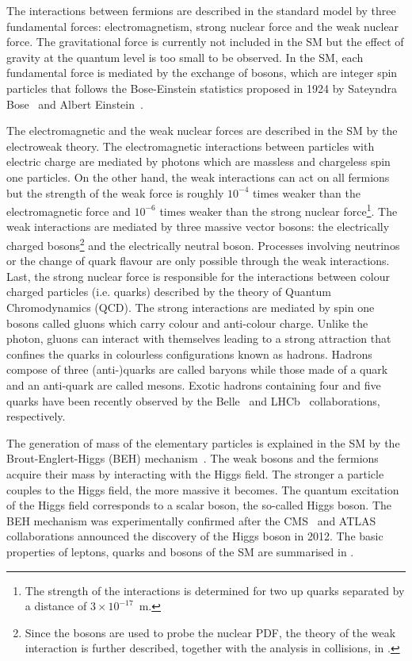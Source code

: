 The interactions between fermions are described in the standard model by three fundamental forces: electromagnetism, strong nuclear force and the weak nuclear force. The gravitational force is currently not included in the SM but the effect of gravity at the quantum level is too small to be observed. In the SM, each fundamental force is mediated by the exchange of bosons, which are integer spin particles that follows the Bose-Einstein statistics proposed in 1924 by Sateyndra Bose~\cite{BoseEinsteinStatistics_1} and Albert Einstein~\cite{BoseEinsteinStatistics_2}.

The electromagnetic and the weak nuclear forces are described in the SM by the electroweak theory. The electromagnetic interactions between particles with electric charge are mediated by photons which are massless and chargeless spin one particles. On the other hand, the weak interactions can act on all fermions but the strength of the weak force is roughly $10^{-4}$ times weaker than the electromagnetic force and $10^{-6}$ times weaker than the strong nuclear force\footnote{The strength of the interactions is determined for two up quarks separated by a distance of $3\times{10^{-17}}$~m.}. The weak interactions are mediated by three massive vector bosons: the electrically charged \Wpm bosons\footnote{Since the \Wb bosons are used to probe the nuclear PDF, the theory of the weak interaction is further described, together with the analysis in \RunpPb collisions, in .} and the electrically neutral {\PZ} boson. Processes involving neutrinos or the change of quark flavour are only possible through the weak interactions. Last, the strong nuclear force is responsible for the interactions between colour charged particles (i.e. quarks) described by the theory of Quantum Chromodynamics (QCD). The strong interactions are mediated by spin one bosons called gluons which carry colour and anti-colour charge. Unlike the photon, gluons can interact with themselves leading to a strong attraction that confines the quarks in colourless configurations known as hadrons. Hadrons compose of three (anti-)quarks are called baryons while those made of a quark and an anti-quark are called mesons. Exotic hadrons containing four and five quarks have been recently observed by the Belle~\cite{Tetraquark} and LHCb~\cite{Pentaquarks} collaborations, respectively.

The generation of mass of the elementary particles is explained in the SM by the Brout-Englert-Higgs (BEH) mechanism~\cite{HiggsMechanism_1,HiggsMechanism_2}. The weak bosons and the fermions acquire their mass by interacting with the Higgs field. The stronger a particle couples to the Higgs field, the more massive it becomes. The quantum excitation of the Higgs field corresponds to a scalar boson, the so-called Higgs boson. The BEH mechanism was experimentally confirmed after the CMS~\cite{HiggsBoson_CMS} and ATLAS~\cite{HiggsBoson_ATLAS} collaborations announced the discovery of the Higgs boson in 2012. The basic properties of leptons, quarks and bosons of the SM are summarised in .


